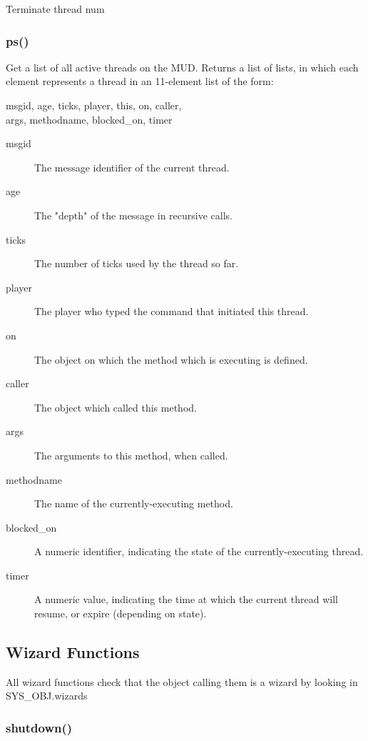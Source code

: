 Terminate thread {\funcarg num }

\subsubsection{\func ps()}

Get a list of all active threads on the MUD.  Returns a list of lists,
in which each element represents a thread in an 11-element list of the
form:

\begin{code}
{ msgid, age, ticks, player, this, on, caller, \\
args, methodname, blocked\_on, timer }
\end{code}

\begin{description}
\item [msgid] The message identifier of the current thread.
\item [age] The "depth" of the message in recursive calls.
\item [ticks] The number of ticks used by the thread so far.
\item [player] The player who typed the command that initiated this thread.
\item [on] The object on which the method which is executing is defined.
\item [caller] The object which called this method.
\item [args] The arguments to this method, when called.
\item [methodname] The name of the currently-executing method.
\item [blocked\_on] A numeric identifier, indicating the state of the
                   currently-executing thread.
\item [timer] A numeric value, indicating the time at which the current
              thread will resume, or expire (depending on state).
\end{description}

\subsection{Wizard Functions}

All wizard functions check that the object calling them is a wizard
by looking in SYS\_OBJ.wizards

\subsubsection{\func shutdown()}

